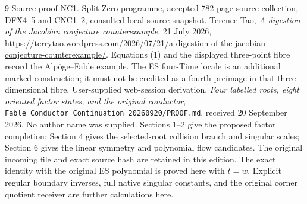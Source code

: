 \documentclass[11pt]{article}
\begin{document}
\begin{thebibliography}{9}
\href{https://github.com/KokunoYumeto/zeta-function-research-reader/blob/5992ad50c0f2a06921f1fcaded7b4e38097c0739/workbenches/splitzero-tandem/continuations/20260920-original-kernel-mixed-determinants/providers/ORIGINAL_CONDUCTOR_COPRIMALITY.tex\#L41}{Source proof NC1}.
 Split-Zero programme, accepted 782-page source
collection, DFX4--5 and CNC1--2, consulted local source snapshot.
 Terence Tao, \emph{A digestion of the Jacobian conjecture
counterexample}, 21 July 2026,
\url{https://terrytao.wordpress.com/2026/07/21/a-digestion-of-the-jacobian-conjecture-counterexample/}.
Equations (1) and the displayed three-point fibre record the
Alp\"oge--Fable example. The ES four-Time locale is an additional marked
construction; it must not be credited as a fourth preimage in that
three-dimensional fibre.
 User-supplied web-session derivation, \emph{Four labelled roots, eight oriented factor states, and the original conductor}, \texttt{Fable\_Conductor\_Continuation\_20260920/PROOF.md}, received 20 September 2026. No author name was supplied. Sections 1--2 give the proposed factor completion; Section 4 gives the selected-root collision branch and singular scales; Section 6 gives the linear symmetry and polynomial flow candidates. The original incoming file and exact source hash are retained in this edition. The exact identity with the original ES polynomial is proved here with $t=w$. Explicit regular boundary inverses, full native singular constants, and the original corner quotient receiver are further calculations here.
\end{thebibliography}
\end{document}
